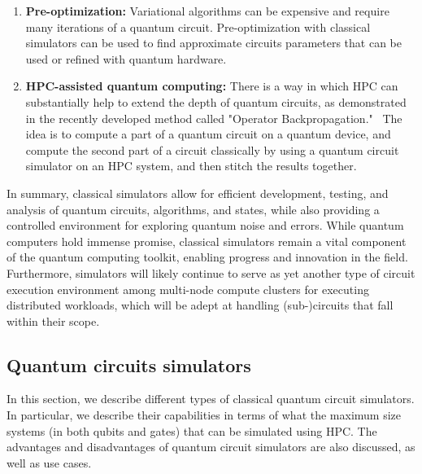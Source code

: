 \begin{enumerate}
  \item {\bf Pre-optimization:}
    Variational algorithms can be expensive and require many iterations of a quantum circuit.  Pre-optimization with classical simulators can be used to find approximate circuits parameters that can be used or refined with quantum hardware.\cite{preopt-0,preopt-1,preopt-2}
    \item {\bf HPC-assisted quantum computing:}
    There is a way in which HPC can substantially help to extend the depth of quantum circuits, as demonstrated in the recently developed method called "Operator Backpropagation."~\cite{IBMQuantumSummit2023} The idea is to compute a part of a quantum circuit on a quantum device, and compute the second part of a circuit classically by using a quantum circuit simulator on an HPC system, and then stitch the results together. 
\end{enumerate}
In summary, classical simulators allow for efficient development, testing, and analysis of quantum circuits, algorithms, and states, while also providing a controlled environment for exploring quantum noise and errors. While quantum computers hold immense promise, classical simulators remain a vital component of the quantum computing toolkit, enabling progress and innovation in the field. Furthermore, simulators will likely continue to serve as yet another type of circuit execution environment among multi-node compute clusters for executing distributed workloads, which will be adept at handling (sub-)circuits that fall within their scope.

\subsection{Quantum circuits simulators}

In this section, we describe different types of classical quantum circuit simulators. In particular, we describe their capabilities in terms of what the maximum size systems (in both qubits and gates) that can be simulated using HPC. The advantages and disadvantages of quantum circuit simulators are also discussed, as well as use cases.

